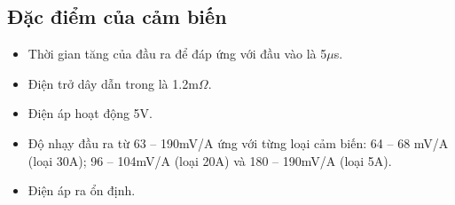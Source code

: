 \subsection{Đặc điểm của cảm biến}
    \begin{itemize}
        \item Thời gian tăng của đầu ra để đáp ứng với đầu vào là 5$\mu$s.
        \item Điện trở dây dẫn trong là 1.2m$\Omega$.
        \item Điện áp hoạt động 5V.
        \item Độ nhạy đầu ra từ 63 -- 190mV/A ứng với từng loại cảm biến: 64 -- 68 mV/A (loại 30A); 96 -- 104mV/A (loại 20A) và 180 -- 190mV/A (loại 5A).
        \item Điện áp ra ổn định.
    \end{itemize}
